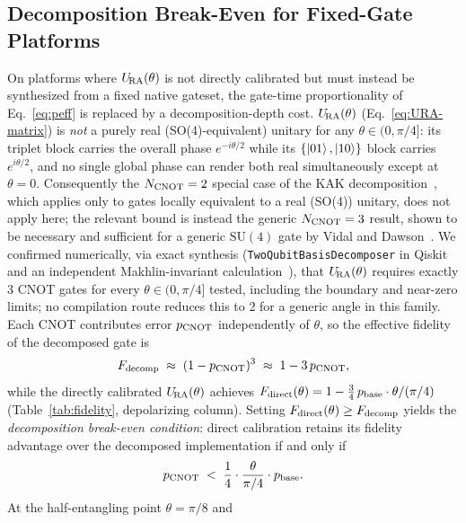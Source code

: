 \subsection{Decomposition Break-Even for Fixed-Gate Platforms}
\label{subsec:decomp-breakeven}

On platforms where $U_{\!\mathrm{RA}}(\theta)$ is not directly calibrated but must
instead be synthesized from a fixed native gateset, the gate-time
proportionality of Eq.~\eqref{eq:peff} is replaced by a
decomposition-depth cost.
$U_{\!\mathrm{RA}}(\theta)$ (Eq.~\eqref{eq:URA-matrix}) is \emph{not} a purely real
(SO(4)-equivalent) unitary for any $\theta \in (0,\pi/4]$: its triplet
block carries the overall phase $e^{-i\theta/2}$ while its
$\{\ket{01},\ket{10}\}$ block carries $e^{i\theta/2}$, and no single
global phase can render both real simultaneously except at $\theta = 0$.
Consequently the $N_{\rm CNOT} = 2$ special case of the KAK
decomposition~\cite{VatanWilliams2004}, which applies only to gates locally equivalent to a real (SO(4)) unitary, does not apply here;
the relevant bound is instead the generic
$N_{\rm CNOT} = 3$ result, shown to be necessary and
sufficient for a generic $\mathrm{SU}(4)$ gate by
Vidal and Dawson~\cite{VidalDawson2004}.
We confirmed numerically, via exact synthesis
(\texttt{TwoQubitBasisDecomposer} in Qiskit and an independent
Makhlin-invariant calculation~\cite{Makhlin2002}), that $U_{\!\mathrm{RA}}(\theta)$
requires exactly 3 CNOT gates for every $\theta \in (0,\pi/4]$ tested,
including the boundary and near-zero limits; no compilation route
reduces this to 2 for a generic angle in this family.
Each CNOT contributes error $p_{\rm CNOT}$ independently of $\theta$,
so the effective fidelity of the decomposed gate is
%
\begin{equation}
\label{eq:fidelity-decomp}
F_{\rm decomp}
  \;\approx\; (1 - p_{\rm CNOT})^3
  \;\approx\; 1 - 3\,p_{\rm CNOT},
\end{equation}
%
while the directly calibrated $U_{\!\mathrm{RA}}(\theta)$ achieves
$F_{\rm direct}(\theta) = 1 - \tfrac{3}{4}\,p_{\rm base}\cdot\theta/(\pi/4)$
(Table~\ref{tab:fidelity}, depolarizing column).
Setting $F_{\rm direct}(\theta) \geq F_{\rm decomp}$ yields the
\emph{decomposition break-even condition}: direct calibration retains
its fidelity advantage over the decomposed implementation if and only if
%
\begin{equation}
\label{eq:breakeven}
p_{\rm CNOT}
  \;<\; \frac{1}{4}\cdot\frac{\theta}{\pi/4}\cdot p_{\rm base}.
\end{equation}
%
At the half-entangling point $\theta = \pi/8$ and
